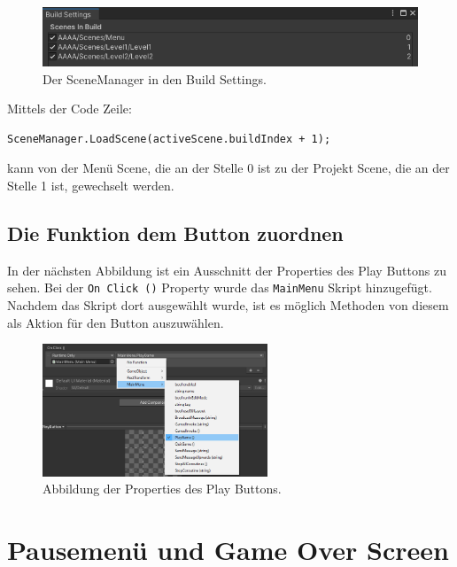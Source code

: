 \begin{center}
    \begin{figure}[h]
        \centering
        \includegraphics*[width=1\textwidth]{chapters/03/images/SceneManager.png}
        \caption{Der SceneManager in den Build Settings.}
        \label{htl04}
    \end{figure}
\end{center}

\noindent
Mittels der Code Zeile: 
\begin{lstlisting}[language=CSharp]
    SceneManager.LoadScene(activeScene.buildIndex + 1);
\end{lstlisting}
kann von der Menü Scene, die an der Stelle 0 ist zu der Projekt Scene, die an der Stelle 1 ist, gewechselt werden.

\pagebreak

\subsection{Die Funktion dem Button zuordnen}

In der nächsten Abbildung ist ein Ausschnitt der Properties des Play Buttons zu sehen. Bei der \verb+On Click ()+ Property wurde das \verb+MainMenu+ Skript hinzugefügt. Nachdem das Skript dort ausgewählt wurde, ist es möglich Methoden von diesem als Aktion für den Button auszuwählen. 

\begin{figure}[H]
    \centering
    \includegraphics[width=0.6\textwidth]{chapters/03/images/PlayButton.png}
    \caption{Abbildung der Properties des Play Buttons.}
    \label{htl05}
\end{figure}

\section{Pausemenü und Game Over Screen}


